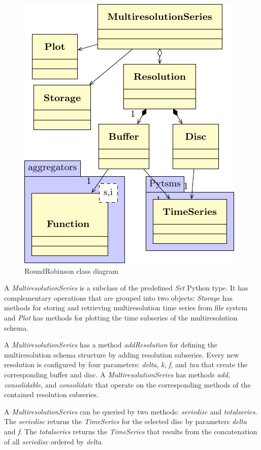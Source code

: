 \begin{figure}[tp]
  \centering
  \includegraphics{fig_roundrobinson_uml.pdf}
  \caption{RoundRobinson  class diagram}
  \label{fig:implementacio:roundrobinson-uml}
\end{figure}



A \emph{MultiresolutionSeries} is a subclass of the predefined \emph{Set} Python
type. It has complementary operations that are grouped into two
objects: \emph{Storage} has methods for storing and retrieving
multiresolution time series from file system and \emph{Plot} has
methods for plotting the time subseries of the multiresolution schema.


A \emph{MultiresolutionSeries} has a method \emph{addResolution} for defining
the multiresolution schema structure by adding resolution
subseries. Every new resolution is configured by four parameters:
\emph{delta}, \emph{k}, \emph{f}, and \emph{tau} that create the
corresponding buffer and disc.  A \emph{MultiresolutionSeries} has methods
\emph{add}, \emph{consolidable}, and \emph{consolidate} that operate on
the corresponding methods of the contained resolution subseries.


A \emph{MultiresolutionSeries} can be queried by two methods:
\emph{seriedisc} and \emph{totalseries}. The \emph{seriedisc} returns
the \emph{TimeSeries} for the selected disc by parameters \emph{delta}
and \emph{f}. The \emph{totalseries} returns the \emph{TimeSeries}
that results from the concatenation of all \emph{seriedisc} ordered by
\emph{delta}.

